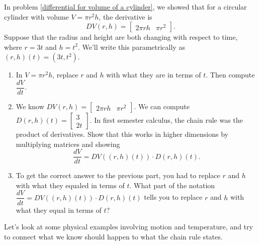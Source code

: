 \begin{problem}
 In problem \ref{differential for volume of a cylinder}, we showed that for a circular cylinder with volume $V=\pi r^2 h$, the derivative is 
$$DV(r,h)=\begin{bmatrix}
2\pi rh & \pi r^2
\end{bmatrix}.$$  
Suppose that the radius and height are both changing with respect to time, where $r=3t$ and $h=t^2$. We'll write this parametrically as $(r,h)(t) = (3t, t^2)$.  
\begin{enumerate}
 \item In $V=\pi r^2 h$, replace $r$ and $h$ with what they are in terms of $t$. Then compute $\dfrac{dV}{dt}$. 
 \item We know 
$DV(r,h)=\begin{bmatrix}
2\pi rh & \pi r^2
\end{bmatrix}.$ We can compute
$D(r,h)(t)=
\begin{bmatrix}
3\\  2t
\end{bmatrix}.$
In first semester calculus, the chain rule was the product of derivatives. Show that this works in higher dimensions by multiplying matrices and showing $$\dfrac{dV}{dt}=DV((r,h)(t))\cdot D(r,h)(t).$$ 
 \item To get the correct answer to the previous part, you had to replace $r$ and $h$ with what they equaled in terms of $t$.  What part of the notation $\dfrac{dV}{dt}=DV((r,h)(t))\cdot D(r,h)(t)$ tells you to replace $r$ and $h$ with what they equal in terms of $t$?
\end{enumerate}



\end{problem}


Let's look at some physical examples involving motion and temperature, and try to connect what we know should happen to what the chain rule states.


